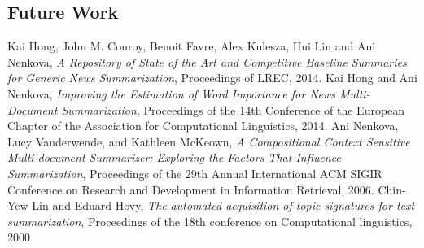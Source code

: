 \documentclass{article}
\begin{document}
\subsection{Future Work}

\newpage
\begin{thebibliography}{99}
    Kai Hong, John M. Conroy, Benoit Favre, Alex Kulesza, Hui Lin and Ani Nenkova,
    \emph{A Repository of State of the Art and Competitive Baseline Summaries for Generic News Summarization},
    Proceedings of LREC, 2014.
    Kai Hong and Ani Nenkova,
    \emph{Improving the Estimation of Word Importance for News Multi-Document Summarization},
    Proceedings of the 14th Conference of the European Chapter of the Association for Computational Linguistics, 2014.
    Ani Nenkova, Lucy Vanderwende, and Kathleen McKeown,
    \emph{A Compositional Context Sensitive Multi-document Summarizer: Exploring the Factors That Influence Summarization},
    Proceedings of the 29th Annual International ACM SIGIR Conference on Research and Development in Information Retrieval, 2006.
    Chin-Yew Lin and Eduard Hovy,
    \emph{The automated acquisition of topic signatures for text summarization},
    Proceedings of the 18th conference on Computational linguistics,
    2000
\end{thebibliography}
\end{document}
